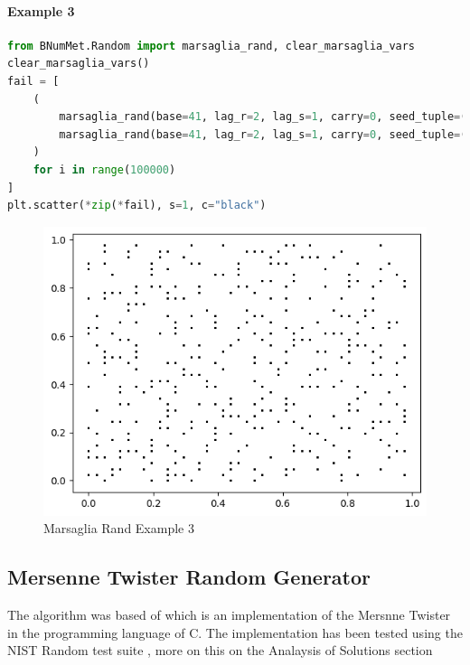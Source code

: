 \paragraph{Example 3}{
\begin{lstlisting}[language=Python]
from BNumMet.Random import marsaglia_rand, clear_marsaglia_vars
clear_marsaglia_vars()
fail = [
    (
        marsaglia_rand(base=41, lag_r=2, lag_s=1, carry=0, seed_tuple=(0, 1)),
        marsaglia_rand(base=41, lag_r=2, lag_s=1, carry=0, seed_tuple=(0, 1)),
    )
    for i in range(100000)
]
plt.scatter(*zip(*fail), s=1, c="black")
\end{lstlisting}
\begin{figure}[H]
    \centering
    \includegraphics{Include/Images/Thesis/Documentation/Randomness/Marsaglia Rand Example 3.png}
    \caption{Marsaglia Rand Example 3}
    \label{fig:Marsaglia Rand Example 3}
\end{figure}
}

\subsection{Mersenne Twister Random Generator}
The algorithm was based of \cite{10.5555/148286} which is an implementation of the Mersnne Twister in the programming language of C. The implementation has been tested using the NIST Random test suite \cite{smid2010statistical}, more on this on the Analaysis of Solutions section

